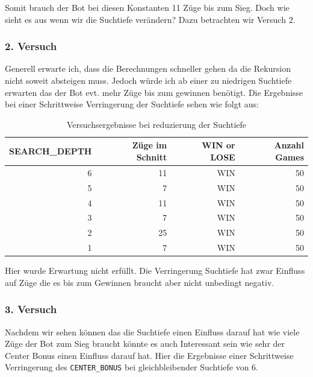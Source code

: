 Somit brauch der Bot bei diesen Konstanten 11 Züge bis zum Sieg. Doch wie sieht es aus wenn wir die Suchtiefe verändern? Dazu betrachten wir Versuch 2.


\newpage

\subsubsection{2. Versuch}

Generell erwarte ich, dass die Berechnungen schneller gehen da die Rekursion nicht soweit absteigen muss. Jedoch würde ich ab einer zu niedrigen Suchtiefe erwarten das der Bot evt. mehr Züge bis zum gewinnen benötigt. Die Ergebnisse bei einer Schrittweise Verringerung der Suchtiefe sehen wie folgt aus:

\begin{table}[ht]
	\caption{Versuchsergebnisse bei reduzierung der Suchtiefe}\label{table:firstExperiemt}
	\begin{center}
		\begin{tabular}{r|r|r|r}
			SEARCH\_DEPTH & Züge im Schnitt & WIN or LOSE & Anzahl Games\\
			\hline
			6 &  11 & WIN & 50 \\
			5 &   7 & WIN & 50\\
			4 &  11 & WIN & 50 \\
			3 &   7 & WIN & 50 \\
			2 &  25 & WIN & 50 \\
			1 &   7 & WIN & 50 \\
		\end{tabular}
	\end{center}
\end{table}

Hier wurde Erwartung nicht erfüllt. Die Verringerung Suchtiefe hat zwar Einfluss auf Züge die es bis zum Gewinnen braucht aber nicht unbedingt negativ. 

\newpage

\subsubsection{3. Versuch}

Nachdem wir sehen können das die Suchtiefe einen Einfluss darauf hat wie viele Züge der Bot zum Sieg braucht könnte es auch Interessant sein wie sehr der Center Bonus einen Einfluss darauf hat. Hier die Ergebnisse einer Schrittweise Verringerung des \texttt{CENTER\_BONUS} bei gleichbleibender Suchtiefe von 6.

